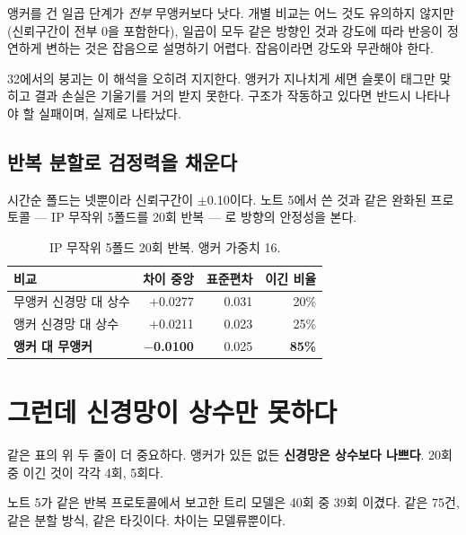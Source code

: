 \documentclass[10pt]{article}
\begin{document}
앵커를 건 일곱 단계가 \emph{전부} 무앵커보다 낫다. 개별 비교는 어느 것도 유의하지
않지만(신뢰구간이 전부 0을 포함한다), 일곱이 모두 같은 방향인 것과 강도에 따라 반응이
정연하게 변하는 것은 잡음으로 설명하기 어렵다. 잡음이라면 강도와 무관해야 한다.

32에서의 붕괴는 이 해석을 오히려 지지한다. 앵커가 지나치게 세면 슬롯이 태그만 맞히고
결과 손실은 기울기를 거의 받지 못한다. 구조가 작동하고 있다면 반드시 나타나야 할
실패이며, 실제로 나타났다.

\subsection{반복 분할로 검정력을 채운다}

시간순 폴드는 넷뿐이라 신뢰구간이 $\pm$0.10이다. 노트 5에서 쓴 것과 같은 완화된
프로토콜 --- IP 무작위 5폴드를 20회 반복 --- 로 방향의 안정성을 본다.

\begin{table}[t]
\centering\tsize
\caption{IP 무작위 5폴드 20회 반복. 앵커 가중치 16.}
\begin{tabular}{lrrr}
\toprule
비교 & 차이 중앙 & 표준편차 & 이긴 비율 \\
\midrule
무앵커 신경망 대 상수 & $+$0.0277 & 0.031 & 20\% \\
앵커 신경망 대 상수   & $+$0.0211 & 0.023 & 25\% \\
\midrule
\textbf{앵커 대 무앵커} & \textbf{$-$0.0100} & 0.025 & \textbf{85\%} \\
\bottomrule
\end{tabular}
\end{table}


\section{그런데 신경망이 상수만 못하다}

같은 표의 위 두 줄이 더 중요하다. 앵커가 있든 없든 \textbf{신경망은 상수보다
나쁘다}. 20회 중 이긴 것이 각각 4회, 5회다.

노트 5가 같은 반복 프로토콜에서 보고한 트리 모델은 40회 중 39회 이겼다. 같은 75건,
같은 분할 방식, 같은 타깃이다. 차이는 모델류뿐이다.

\end{document}
